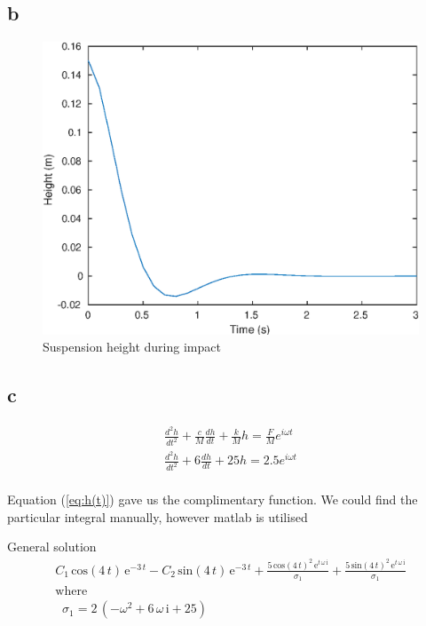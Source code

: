 \subsection{b}
\begin{figure}[h]
	\includegraphics[scale=0.65, center]{./eps/topic6_b.eps}
	\caption{Suspension height during impact}
	\label{fig:Topic6-b}
\end{figure}



\subsection{c}
\begin{equation} \label{eq:forcedVibration}
\begin{split}
    \frac{d^2h}{dt^2} + \frac{c}{M} \frac{dh}{dt} + \frac{k}{M}h = \frac{F}{M} e^{i\omega t} \\
    \frac{d^2h}{dt^2} + 6 \frac{dh}{dt} + 25 h = 2.5 e^{i\omega t} \\
\end{split}
\end{equation}

Equation (\ref{eq:h(t)}) gave us the complimentary function. We could find the particular integral manually, however matlab is utilised


General solution
\begin{equation}
    \begin{array}{l}
        C_1 \,\mathrm{cos}\left(4\,t\right)\,{\mathrm{e}}^{-3\,t} -C_2 \,\mathrm{sin}\left(4\,t\right)\,{\mathrm{e}}^{-3\,t} +\frac{5\,{\mathrm{cos}\left(4\,t\right)}^2 \,{\mathrm{e}}^{t\,\omega\,\mathrm{i}} }{\sigma_1 }+\frac{5\,{\mathrm{sin}\left(4\,t\right)}^2 \,{\mathrm{e}}^{t\,\omega\,\mathrm{i}} }{\sigma_1 }\\
        \textrm{where}\\
        \;\;\sigma_1 =2\,{\left(-\omega^2 +6\,\omega\,\mathrm{i}+25\right)}
        \end{array}
\end{equation}

